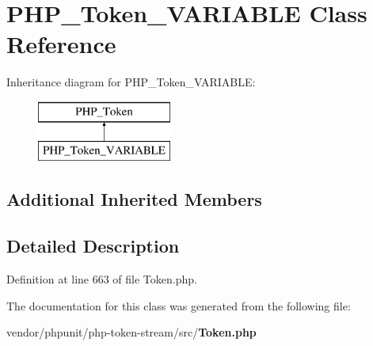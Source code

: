 \section{P\+H\+P\+\_\+\+Token\+\_\+\+V\+A\+R\+I\+A\+B\+L\+E Class Reference}
\label{class_p_h_p___token___v_a_r_i_a_b_l_e}
Inheritance diagram for P\+H\+P\+\_\+\+Token\+\_\+\+V\+A\+R\+I\+A\+B\+L\+E\+:\begin{figure}[H]
\begin{center}
\leavevmode
\includegraphics[height=2.000000cm]{class_p_h_p___token___v_a_r_i_a_b_l_e}
\end{center}
\end{figure}
\subsection*{Additional Inherited Members}


\subsection{Detailed Description}


Definition at line 663 of file Token.\+php.



The documentation for this class was generated from the following file\+:\begin{DoxyCompactItemize}
\item 
vendor/phpunit/php-\/token-\/stream/src/{\bf Token.\+php}\end{DoxyCompactItemize}
